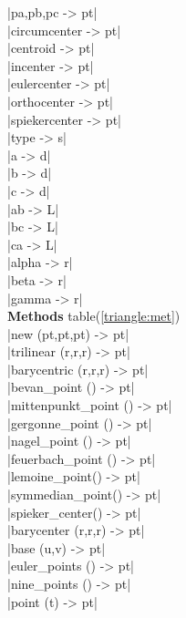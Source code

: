 \documentclass[DIV         = 14,
               fontsize    = 10,
               index       = totoc,
               twoside,
               cadre,
               headings    = small
               ]{tkz-doc}
\begin{document}
\begin{multicols}{3}
|pa,pb,pc                  -> pt|  \\
|circumcenter              -> pt|  \\
|centroid                  -> pt|  \\
|incenter                  -> pt|  \\
|eulercenter               -> pt|  \\
|orthocenter               -> pt|  \\
|spiekercenter             -> pt|  \\
|type                      -> s|   \\
|a                         -> d|   \\
|b                         -> d|   \\
|c                         -> d|   \\
|ab                        -> L|   \\
|bc                        -> L|   \\
|ca                        -> L|   \\
|alpha                     -> r|   \\
|beta                      -> r|   \\
|gamma                     -> r|   \\
\textbf{Methods} table(\ref{triangle:met}) \\
|new (pt,pt,pt)            -> pt|  \\
|trilinear (r,r,r)         -> pt|  \\
|barycentric (r,r,r)       -> pt|  \\
|bevan_point ()            -> pt|  \\
|mittenpunkt_point ()      -> pt|  \\
|gergonne_point ()         -> pt|  \\
|nagel_point ()            -> pt|  \\
|feuerbach_point ()        -> pt|  \\
|lemoine_point()           -> pt|  \\
|symmedian_point()         -> pt|  \\
|spieker_center()          -> pt|  \\
|barycenter (r,r,r)        -> pt|  \\
|base (u,v)                -> pt|  \\
|euler_points ()           -> pt|  \\
|nine_points ()            -> pt|  \\
|point (t)                 -> pt|  \\

\end{multicols}
\end{document}
